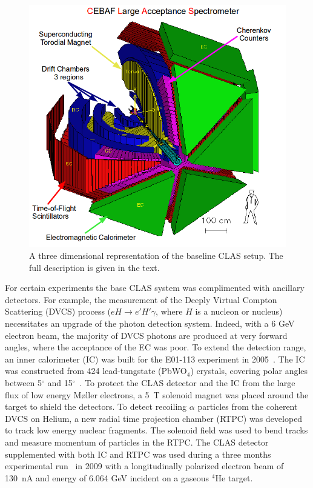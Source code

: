 \documentclass[preprint,5p]{elsarticle}
\begin{document}
\begin{figure}[tbp]
\centering \includegraphics[scale=0.3]{test_clas.png}
\caption{A three dimensional representation of the baseline CLAS setup. The
   full description is given in the text.} \label{fig:CLAS}
\end{figure}

For certain experiments the base CLAS system was complimented with ancillary 
detectors. For example, the measurement of the Deeply Virtual Compton 
Scattering (DVCS) process ($eH \rightarrow e' H' \gamma$, where $H$ is a 
nucleon or nucleus) necessitates an upgrade of the photon detection system.  
Indeed, with a 6 GeV electron beam, the majority of DVCS photons are produced 
at very forward angles, where the acceptance of the EC was poor. To extend the 
detection range, an inner calorimeter (IC) was built for the E01-113 experiment 
in 2005~\cite{Girod:2007aa}. The IC was constructed from 424 lead-tungstate 
(PbWO$_{4}$) crystals, covering polar angles between 5$^{\circ}$ and 
15$^{\circ}$~\cite{Hyon-suk}. To protect the CLAS detector and the IC from the 
large flux of low energy M{\o}ller electrons, a 5~T solenoid magnet was placed 
around the target to shield the detectors.  To detect recoiling $\alpha$ 
particles from the coherent DVCS on Helium, a new radial time projection 
chamber (RTPC) was developed to track low energy nuclear fragments. The 
solenoid field was used to bend tracks and measure momentum of particles in the 
RTPC. The CLAS detector supplemented with both IC and RTPC was used during a 
three months experimental run~\cite{proposal1,proposal2}
in 2009 with a longitudinally polarized electron beam of 130~nA 
and energy of 6.064 GeV incident on a gaseous $^{4}$He target.
\end{document}
